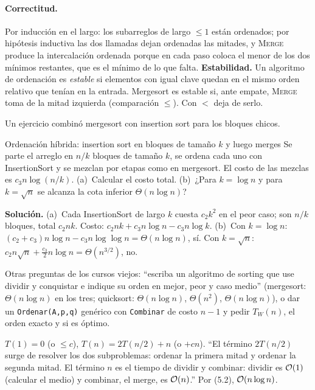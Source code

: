 \paragraph{Correctitud.} Por inducción en el largo: los subarreglos de largo $\le 1$ están ordenados; por hipótesis inductiva las dos llamadas dejan ordenadas las mitades, y \textsc{Merge} produce la intercalación ordenada porque en cada paso coloca el menor de los dos mínimos restantes, que es el mínimo de lo que falta. \textbf{Estabilidad.} Un algoritmo de ordenación es \emph{estable} si elementos con igual clave quedan en el mismo orden relativo que tenían en la entrada. Mergesort es estable si, ante empate, \textsc{Merge} toma de la mitad izquierda (comparación $\le$). Con $<$ deja de serlo.

Un ejercicio combinó mergesort con insertion sort para los bloques chicos.

\begin{problema}{Ordenación híbrida: insertion sort en bloques de tamaño $k$ y luego merges}
Se parte el arreglo en $n/k$ bloques de tamaño $k$, se ordena cada uno con InsertionSort y se mezclan por etapas como en mergesort. El costo de las mezclas es $c_3n\log(n/k)$. (a)~Calcular el costo total. (b)~¿Para $k=\log n$ y para $k=\sqrt n$ se alcanza la cota inferior $\Theta(n\log n)$?

\textbf{Solución.} (a)~Cada InsertionSort de largo $k$ cuesta $c_2k^2$ en el peor caso; son $n/k$ bloques, total $c_2nk$. Costo: $c_2nk+c_3n\log n-c_3n\log k$. (b)~Con $k=\log n$: $(c_2+c_3)n\log n-c_3n\log\log n=\Theta(n\log n)$, sí. Con $k=\sqrt n$: $c_2n\sqrt n+\frac{c_3}{2}n\log n=\Theta(n^{3/2})$, no.
\end{problema}

Otras preguntas de los cursos viejos: ``escriba un algoritmo de sorting que use dividir y conquistar e indique su orden en mejor, peor y caso medio'' (mergesort: $\Theta(n\log n)$ en los tres; quicksort: $\Theta(n\log n)$, $\Theta(n^2)$, $\Theta(n\log n)$), o dar un \texttt{Ordenar(A,p,q)} genérico con \texttt{Combinar} de costo $n-1$ y pedir $T_W(n)$, el orden exacto y si es óptimo.

\begin{receta}
$T(1)=0$ (o $\le c$), $T(n)=2T(n/2)+n$ (o $+cn$). ``El término $2T(n/2)$ surge de resolver los dos subproblemas: ordenar la primera mitad y ordenar la segunda mitad. El término $n$ es el tiempo de dividir y combinar: dividir es $\mathcal{O}(1)$ (calcular el medio) y combinar, el merge, es $\mathcal{O}(n)$.'' Por (5.2), $\mathcal{O}(n\log n)$.
\end{receta}

